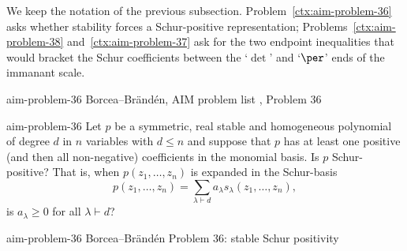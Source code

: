 

\begin{cxcredits}
\end{cxcredits}

\begin{cxcontext}
  We keep the notation of the previous subsection. %
 Problem~\ref{ctx:aim-problem-36} asks whether stability forces a Schur-positive representation; Problems~\ref{ctx:aim-problem-38} and~\ref{ctx:aim-problem-37} ask for the two endpoint inequalities that would bracket the Schur coefficients between the `$\det$' and `$\per$' ends of the immanant scale.
\end{cxcontext}


\begin{cxsource}{aim-problem-36}
Borcea--Br\"and\'en, AIM problem list \citeyearpar{AIMStableProblems}, Problem 36
\end{cxsource}

\begin{cxstatement}{aim-problem-36}
Let $p$ be a symmetric, real stable and homogeneous polynomial of degree $d$ in $n$ variables with $d\le n$ and suppose that $p$ has at least one positive (and then all non-negative) coefficients in the monomial basis.  Is $p$ Schur-positive?  That is, when $p(z_1,\ldots,z_n)$ is expanded in the Schur-basis
\[p(z_1,\ldots,z_n)=\sum_{\lambda\vdash d}a_\lambda s_\lambda(z_1,\ldots,z_n),\]
is $a_\lambda\ge0$ for all $\lambda\vdash d$?
\end{cxstatement}

\begin{cxsummary}{aim-problem-36}
Borcea--Br\"and\'en Problem 36: stable Schur positivity \citeyearpar{AIMStableProblems}
\end{cxsummary}

